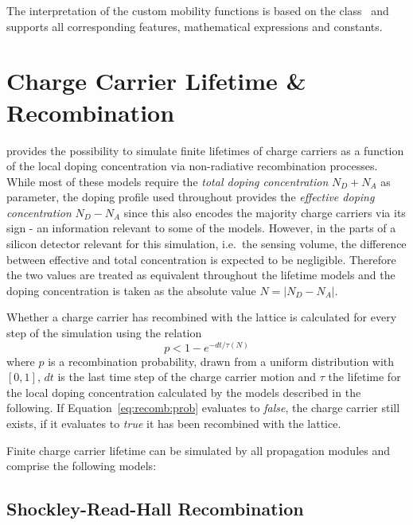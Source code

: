 The interpretation of the custom mobility functions is based on the  class~\cite{rootformula} and supports all corresponding features, mathematical expressions and constants.

\section{Charge Carrier Lifetime \& Recombination}
\label{sec:recombination}

\apsq provides the possibility to simulate finite lifetimes of charge carriers as a function of the local doping concentration via non-radiative recombination processes.
While most of these models require the \emph{total doping concentration} $N_D + N_A$ as parameter, the doping profile used throughout \apsq provides the \emph{effective doping concentration} $N_D - N_A$ since this also encodes the majority charge carriers via its sign - an information relevant to some of the models.
However, in the parts of a silicon detector relevant for this simulation, i.e.\ the sensing volume, the difference between effective and total concentration is expected to be negligible.
Therefore the two values are treated as equivalent throughout the lifetime models and the doping concentration is taken as the absolute value $N = \left|N_D - N_A\right|$.

Whether a charge carrier has recombined with the lattice is calculated for every step of the simulation using the relation
\begin{equation}
    \label{eq:recomb:prob}
    p < 1 - e^{- dt / \tau(N)}
\end{equation}
where $p$ is a recombination probability, drawn from a uniform distribution with $[0, 1]$, $dt$ is the last time step of the charge carrier motion and $\tau$ the lifetime for the local doping concentration calculated by the models described in the following.
If Equation~\eqref{eq:recomb:prob} evaluates to \emph{false}, the charge carrier still exists, if it evaluates to \emph{true} it has been recombined with the lattice.

Finite charge carrier lifetime can be simulated by all propagation modules and comprise the following models:

\subsection{Shockley-Read-Hall Recombination}

